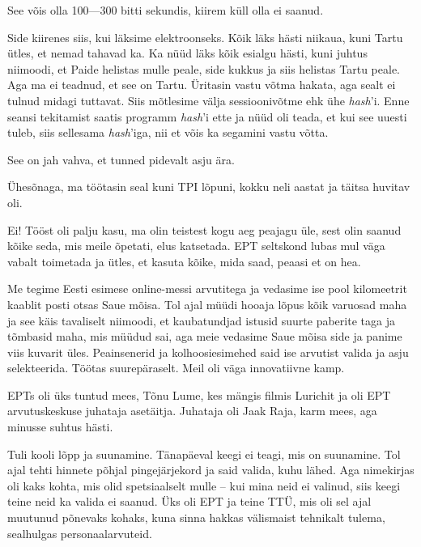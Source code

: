 
See võis olla 100---300 bitti sekundis, kiirem küll olla ei saanud. 

Side kiirenes siis, kui läksime elektroonseks. Kõik läks hästi niikaua, 
kuni Tartu ütles, et nemad tahavad ka. Ka nüüd läks kõik esialgu 
hästi, kuni juhtus niimoodi, et Paide helistas mulle peale, side kukkus ja 
siis helistas Tartu peale. Aga ma ei teadnud, et see on Tartu. Üritasin vastu 
võtma hakata, aga sealt ei tulnud midagi tuttavat. Siis mõtlesime välja sessioonivõtme ehk ühe \emph{hash}'i. Enne seansi
tekitamist saatis programm \emph{hash}'i ette ja nüüd oli teada, et 
kui see uuesti tuleb, siis sellesama \emph{hash}'iga, nii et võis ka segamini 
vastu võtta. 


See on jah vahva, et tunned pidevalt asju ära. 

Ühesõnaga, ma töötasin seal kuni TPI lõpuni, kokku neli aastat ja täitsa huvitav oli.


Ei! Tööst oli palju kasu, ma olin teistest kogu aeg peajagu üle, sest olin 
saanud kõike seda, mis meile õpetati, elus katsetada. EPT seltskond lubas 
mul väga vabalt toimetada ja ütles, et kasuta kõike, mida saad, peaasi 
et on hea. 

Me tegime Eesti esimese online-messi 
arvutitega ja vedasime ise pool kilomeetrit kaablit posti otsas Saue mõisa. Tol 
ajal müüdi hooaja lõpus kõik varuosad maha ja see käis tavaliselt 
niimoodi, et kaubatundjad istusid suurte paberite taga ja tõmbasid maha, mis 
müüdud sai, aga meie vedasime Saue mõisa side ja panime viis kuvarit üles. Peainsenerid ja kolhoosiesimehed said ise 
arvutist valida ja asju selekteerida. Töötas suurepäraselt. Meil oli väga innovatiivne 
kamp.

EPTs oli üks tuntud mees, Tõnu Lume, kes mängis filmis 
Lurichit ja 
oli EPT arvutuskeskuse juhataja asetäitja. Juhataja oli Jaak Raja, karm mees, aga minusse suhtus hästi. 


Tuli kooli lõpp ja suunamine. Tänapäeval keegi ei teagi, mis on suunamine. 
Tol ajal tehti hinnete põhjal pingejärjekord ja said valida, kuhu lähed. Aga nimekirjas oli kaks kohta, mis 
olid spetsiaalselt mulle -- kui mina neid ei valinud, siis keegi teine neid 
ka valida ei saanud. Üks oli EPT ja teine TTÜ, mis oli sel 
ajal muutunud põnevaks kohaks, kuna sinna hakkas välismaist
tehnikalt tulema, sealhulgas personaalarvuteid. 

